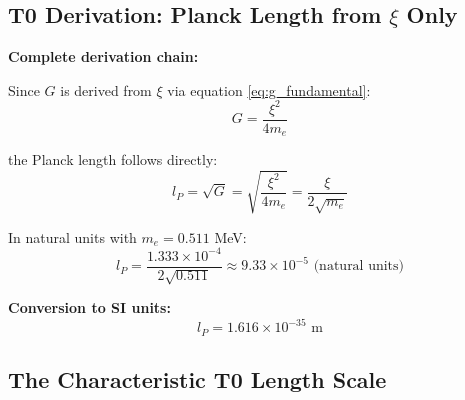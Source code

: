 \documentclass[12pt,a4paper]{article}
\begin{document}
	\subsection{T0 Derivation: Planck Length from $\xi$ Only}
	
	\begin{keyresult}
		\textbf{Complete derivation chain:}
		
		Since $G$ is derived from $\xi$ via equation \eqref{eq:g_fundamental}:
		\begin{equation}
			G = \frac{\xi^2}{4 m_e}
		\end{equation}
		
		the Planck length follows directly:
		\begin{equation}
			l_P = \sqrt{G} = \sqrt{\frac{\xi^2}{4 m_e}} = \frac{\xi}{2\sqrt{m_e}}
		\end{equation}
		
		In natural units with $m_e = 0.511$ MeV:
		\begin{equation}
			l_P = \frac{1.333 \times 10^{-4}}{2\sqrt{0.511}} \approx 9.33 \times 10^{-5} \text{ (natural units)}
		\end{equation}
		
		\textbf{Conversion to SI units:}
		\begin{equation}
			\boxed{l_P = 1.616 \times 10^{-35} \text{ m}}
		\end{equation}
	\end{keyresult}
	
	\subsection{The Characteristic T0 Length Scale}
	
\end{document}
